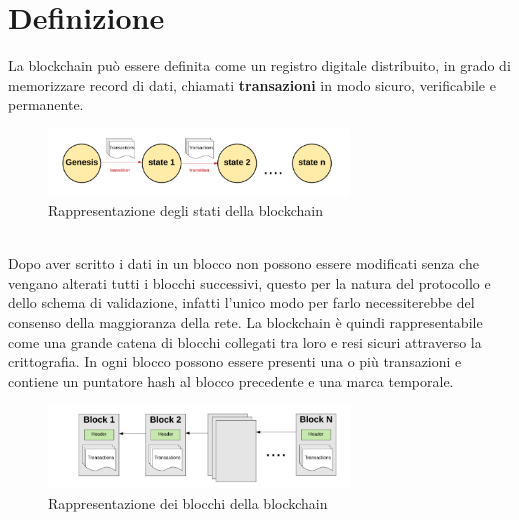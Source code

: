 \documentclass[a4paper,11pt]{report}
\begin{document}
\section{Definizione}
La blockchain può essere definita come un registro digitale distribuito, in grado di memorizzare record di dati, chiamati \textbf{transazioni} in modo sicuro, verificabile e permanente. \\
\begin{figure}[htbp] 
\begin{center}
\includegraphics[width=8cm]{img/genesis.png} 
\end{center}
\caption{Rappresentazione degli stati della blockchain}
\end{figure}
\\Dopo aver scritto i dati in un blocco non possono essere modificati senza che vengano alterati tutti i blocchi successivi, questo per la natura del protocollo e dello schema di validazione, infatti l'unico modo per farlo necessiterebbe del consenso della maggioranza della rete. La blockchain è quindi rappresentabile come una grande catena di blocchi collegati tra loro e resi sicuri attraverso la crittografia. In ogni blocco possono essere presenti una o più transazioni e contiene un puntatore hash al blocco precedente e una marca temporale. \\

\begin{figure}[htbp] 
\begin{center}
\includegraphics[width=8cm]{img/blkc.png} 
\end{center}
\caption{Rappresentazione dei blocchi della blockchain}
\end{figure}
\end{document}
